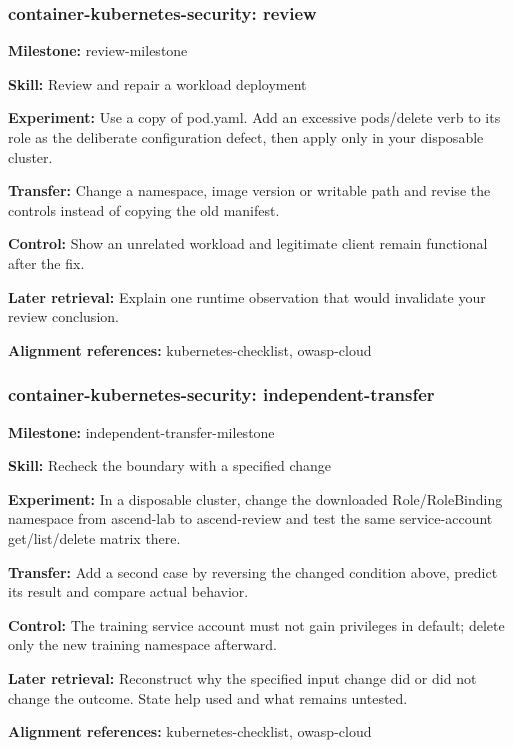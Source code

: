 \subsubsection{container-kubernetes-security: review}
\noindent\textbf{Milestone:} review-milestone\par
\noindent\textbf{Skill:} Review and repair a workload deployment\par
\noindent\textbf{Experiment:} Use a copy of pod.yaml. Add an excessive pods/delete verb to its role as the deliberate configuration defect, then apply only in your disposable cluster.\par
\noindent\textbf{Transfer:} Change a namespace, image version or writable path and revise the controls instead of copying the old manifest.\par
\noindent\textbf{Control:} Show an unrelated workload and legitimate client remain functional after the fix.\par
\noindent\textbf{Later retrieval:} Explain one runtime observation that would invalidate your review conclusion.\par
\noindent\textbf{Alignment references:} kubernetes-checklist, owasp-cloud\par
\subsubsection{container-kubernetes-security: independent-transfer}
\noindent\textbf{Milestone:} independent-transfer-milestone\par
\noindent\textbf{Skill:} Recheck the boundary with a specified change\par
\noindent\textbf{Experiment:} In a disposable cluster, change the downloaded Role/RoleBinding namespace from ascend-lab to ascend-review and test the same service-account get/list/delete matrix there.\par
\noindent\textbf{Transfer:} Add a second case by reversing the changed condition above, predict its result and compare actual behavior.\par
\noindent\textbf{Control:} The training service account must not gain privileges in default; delete only the new training namespace afterward.\par
\noindent\textbf{Later retrieval:} Reconstruct why the specified input change did or did not change the outcome. State help used and what remains untested.\par
\noindent\textbf{Alignment references:} kubernetes-checklist, owasp-cloud\par
